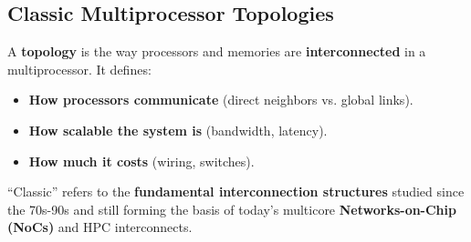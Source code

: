 \subsection{Classic Multiprocessor Topologies}

A \textbf{topology} is the way processors and memories are \textbf{interconnected} in a multiprocessor. It defines:
\begin{itemize}
    \item \textbf{How processors communicate} (direct neighbors vs. global links).
    \item \textbf{How scalable the system is} (bandwidth, latency).
    \item \textbf{How much it costs} (wiring, switches).
\end{itemize}
``Classic'' refers to the \textbf{fundamental interconnection structures} studied since the 70s-90s and still forming the basis of today's multicore \textbf{Networks-on-Chip (NoCs)} and HPC interconnects.

